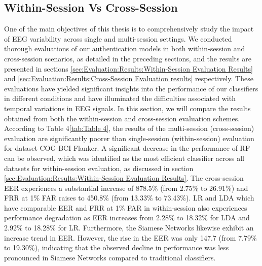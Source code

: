 

\subsection{Within-Session Vs Cross-Session}
One of the main objectives of this thesis is to comprehensively study the impact of EEG variability across single and multi-session settings. We conducted thorough evaluations of our authentication models in both within-session and cross-session scenarios, as detailed in the preceding sections, and the results are presented in sections \ref{sec:Evaluation:Results:Within-Session Evaluation Results} and \ref{sec:Evaluation:Results:Cross-Session Evaluation results} respectively. These evaluations have yielded significant insights into the performance of our classifiers in different conditions and have illuminated the difficulties associated with temporal variations in EEG signals. 
In this section, we will compare the results obtained from both the within-session and cross-session evaluation schemes. According to Table 4\ref{tab:Table 4}, the results of the multi-session (cross-session) evaluation are significantly poorer than single-session (within-session) evaluation for dataset COG-BCI Flanker. A significant decrease in the performance of RF can be observed, which was identified as the most efficient classifier across all datasets for within-session evaluation, as discussed in section \ref{sec:Evaluation:Results:Within-Session Evaluation Results}. The cross-session EER experiences a substantial increase of 878.5$\%$ (from 2.75$\%$ to 26.91$\%$) and FRR at 1$\%$ FAR raises to 450.8$\%$ (from 13.33$\%$ to 73.43$\%$). LR and LDA which have comparable EER and FRR at 1$\%$ FAR in within-session also experiences performance degradation as EER increases from 2.28$\%$ to 18.32$\%$ for LDA and 2.92$\%$ to 18.28$\%$ for LR. Furthermore, the Siamese Networks likewise exhibit an increase trend in EER. However, the rise in the EER was only 147.7 (from 7.79$\%$ to 19.30$\%$), indicating that the observed decline in performance was less pronounced in Siamese Networks compared to traditional classifiers.
\smallskip

